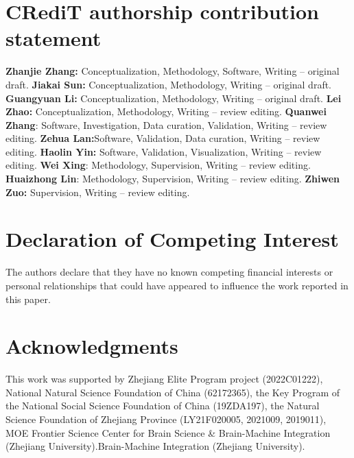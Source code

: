 \documentclass[times,twocolumn,final,authoryear]{elsarticle}
\begin{document}
\section{CRediT authorship contribution statement}
\textbf{Zhanjie Zhang:} Conceptualization, Methodology, Software, Writing – original draft. 
\textbf{Jiakai Sun:} Conceptualization, Methodology, Writing – original draft.
\textbf{Guangyuan Li:} Conceptualization, Methodology, Writing – original draft.
\textbf{Lei Zhao:} Conceptualization, Methodology, Writing – review editing. 
\textbf{Quanwei Zhang}: Software, Investigation, Data curation, Validation, Writing – review editing. 
\textbf{Zehua Lan:}Software, Validation, Data curation, Writing – review editing.
\textbf{Haolin Yin:} Software, Validation, Visualization, Writing – review editing. 
\textbf{Wei Xing}: Methodology, Supervision, Writing – review editing. 
\textbf{Huaizhong Lin}: Methodology, Supervision, Writing – review editing. 
\textbf{Zhiwen Zuo:} Supervision, Writing – review editing.

\section{Declaration of Competing Interest}
The authors declare that they have no known competing financial interests or personal relationships that could have appeared to influence the work reported in this paper.

\section{Acknowledgments}
This work was supported by Zhejiang Elite Program project (2022C01222),  National Natural Science Foundation of China (62172365), the Key Program of the National Social Science Foundation of China (19ZDA197), the Natural Science Foundation of Zhejiang Province (LY21F020005, 2021009, 2019011), MOE Frontier Science Center for Brain Science \& Brain-Machine Integration (Zhejiang University).Brain-Machine Integration (Zhejiang University).




\end{document}
